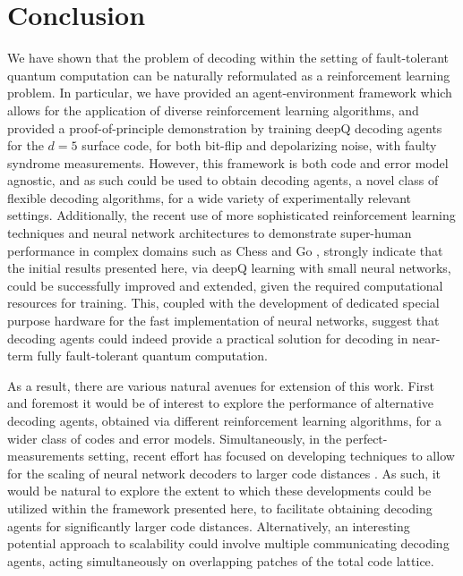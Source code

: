 \documentclass[twocolumn,preprintnumbers,amsmath,amssymb,notitlepage,nofootinbib,longbibliography,superscriptaddress,aps,pra,10pt]{revtex4-1}
\begin{document}
\section{Conclusion}\label{s:conclusions}

	We have shown that the problem of decoding within the setting of fault-tolerant quantum computation can be naturally reformulated as a reinforcement learning problem.
	In particular, we have provided an agent-environment framework which allows for the application of diverse reinforcement learning algorithms, and provided a proof-of-principle demonstration by training deepQ decoding agents for the $d=5$ surface code, for both bit-flip and depolarizing noise, with faulty syndrome measurements.
	However, this framework is both code and error model agnostic, and as such could be used to obtain decoding agents, a novel class of flexible decoding algorithms, for a wide variety of experimentally relevant settings.
	Additionally, the recent use of more sophisticated reinforcement learning techniques and neural network architectures to demonstrate super-human performance in complex domains such as Chess and Go \cite{RLSilver17b,RLsilver2017mastering,RLSilver2016}, strongly indicate that the initial results presented here, via deepQ learning with small neural networks, could be successfully improved and extended, given the required computational resources for training.
	This, coupled with the development of dedicated special purpose hardware for the fast implementation of neural networks, suggest that decoding agents could indeed provide a practical solution for decoding in near-term fully fault-tolerant quantum computation.

	As a result, there are various natural avenues for extension of this work. 
	First and foremost it would be of interest to explore the performance of alternative decoding agents, obtained via different reinforcement learning algorithms, for a wider class of codes and error models.
	Simultaneously, in the perfect-measurements setting, recent effort has focused on developing techniques to allow for the scaling of neural network decoders to larger code distances \cite{Ni18}.
	As such, it would be natural to explore the extent to which these developments could be utilized within the framework presented here, to facilitate obtaining decoding agents for significantly larger code distances. Alternatively, an interesting potential approach to scalability could involve multiple communicating decoding agents, acting simultaneously on overlapping patches of the total code lattice.
	
\end{document}
